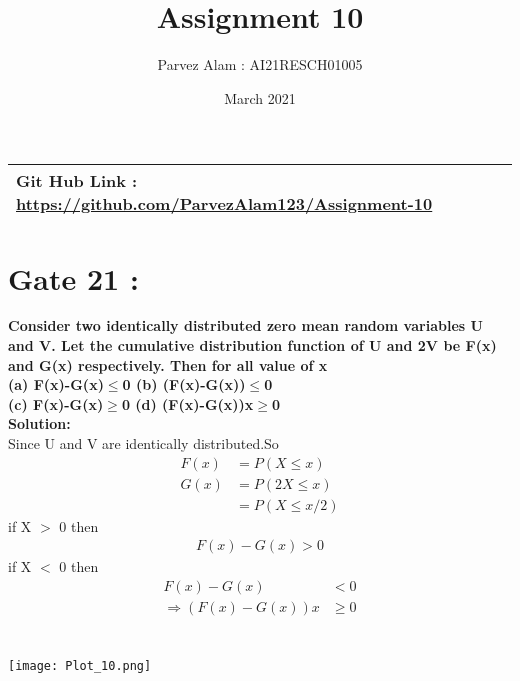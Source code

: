 \documentclass{article}
\title{Assignment 10}
\author{Parvez Alam : AI21RESCH01005 }
\date{March 2021}
\begin{document}
\maketitle
\begin{multicols}{2}
\begin{center}
    \begin{tabular}{|p{5cm}|}
    \hline
         Git Hub Link : \url{https://github.com/ParvezAlam123/Assignment-10} \\
    \hline
    \end{tabular}
\end{center}


\section{Gate 21 :}
\textbf{Consider two identically distributed zero mean random variables U and V. Let the cumulative distribution function of U and 2V be F(x) and G(x) respectively. Then for all value of x  \\
(a) F(x)-G(x)\(\leq\)0  (b) (F(x)-G(x))\(\leq\)0 \\
(c) F(x)-G(x)\(\geq\)0  (d) (F(x)-G(x))x\(\geq\)0} \\
\textbf{Solution: } \\
Since U and V are identically distributed.So
\begin{align}
    F(x) &= P(X\leq x) \nonumber \\
    G(x) &= P(2X\leq x) \nonumber \\
         &= P(X \leq x/2) \nonumber
\end{align}
if X \(>\) 0 then 
\begin{align}
    F(x)-G(x)>0 \nonumber
\end{align}
if X \(<\) 0 then
\begin{align}
    F(x)-G(x)&<0 \nonumber \\
    \Rightarrow (F(x)-G(x))x& \geq 0 \nonumber 
\end{align}
\\ \\
\texttt{[image: Plot\_10.png]}



\end{multicols}
\end{document}
